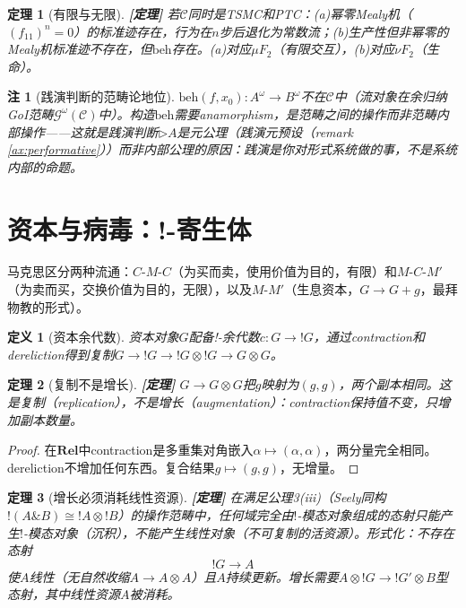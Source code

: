 \documentclass[11pt,a4paper]{article}
\newtheorem{definition}{定义}
\newtheorem{theorem}{定理}
\newtheorem{remark}{注}
\newcommand{\lvl}[1]{\hfill\textbf{\footnotesize[#1]}}
\newcommand{\lvP}{\lvl{定理}}
\newcommand{\bang}{{!}}
\newcommand{\tensor}{\otimes}
\begin{document}
\begin{theorem}[有限与无限]\label{thm:finite-infinite}\lvP
若$\mathcal{C}$同时是TSMC和PTC：(a)幂零Mealy机（$(f_{11})^n=0$）的标准迹存在，行为在$n$步后退化为常数流；(b)生产性但非幂零的Mealy机标准迹不存在，但$\mathrm{beh}$存在。(a)对应$\mu F_2$（有限交互），(b)对应$\nu F_2$（生命）。
\end{theorem}

\begin{remark}[践演判断的范畴论地位]
$\mathrm{beh}(f,x_0):A^\omega\to B^\omega$不在$\mathcal{C}$中（流对象在余归纳GoI范畴$\mathcal{G}^\omega(\mathcal{C})$中）。构造$\mathrm{beh}$需要anamorphism，是范畴之间的操作而非范畴内部操作——这就是践演判断$\triangleright A$是元公理（践演元预设（remark \ref{ax:performative}））而非内部公理的原因：践演是你对形式系统\emph{做}的事，不是系统内部的命题。
\end{remark}

\section{资本与病毒：!-寄生体}

马克思区分两种流通：$C$-$M$-$C$（为买而卖，使用价值为目的，有限）和$M$-$C$-$M'$（为卖而买，交换价值为目的，无限），以及$M$-$M'$（生息资本，$G\to G+g$，最拜物教的形式）。

\begin{definition}[资本余代数]
资本对象$G$配备!-余代数$c:G\to\bang G$，通过contraction和dereliction得到复制$G\to\bang G\to\bang G\tensor\bang G\to G\tensor G$。
\end{definition}

\begin{theorem}[复制不是增长]\label{thm:copy-not-growth}\lvP
$G\to G\tensor G$把$g$映射为$(g,g)$，两个副本相同。这是复制（replication），不是增长（augmentation）：contraction保持值不变，只增加副本数量。
\end{theorem}

\begin{proof}
在$\mathbf{Rel}$中contraction是多重集对角嵌入$\alpha\mapsto(\alpha,\alpha)$，两分量完全相同。dereliction不增加任何东西。复合结果$g\mapsto(g,g)$，无增量。
\end{proof}

\begin{theorem}[增长必须消耗线性资源]\label{thm:growth-needs-linear}\lvP
在满足公理3(iii)（Seely同构~\cite{seely89}$\bang(A\&B)\cong\bang A\tensor\bang B$）的操作范畴中，任何域完全由$\bang$-模态对象组成的态射只能产生$\bang$-模态对象（沉积），不能产生线性对象（不可复制的活资源）。形式化：不存在态射
$$\bang G\longrightarrow A$$
使$A$线性（无自然收缩$A\to A\tensor A$）且$A$持续更新。增长需要$A\tensor\bang G\to\bang G'\tensor B$型态射，其中线性资源$A$被消耗。
\end{theorem}
\end{document}
